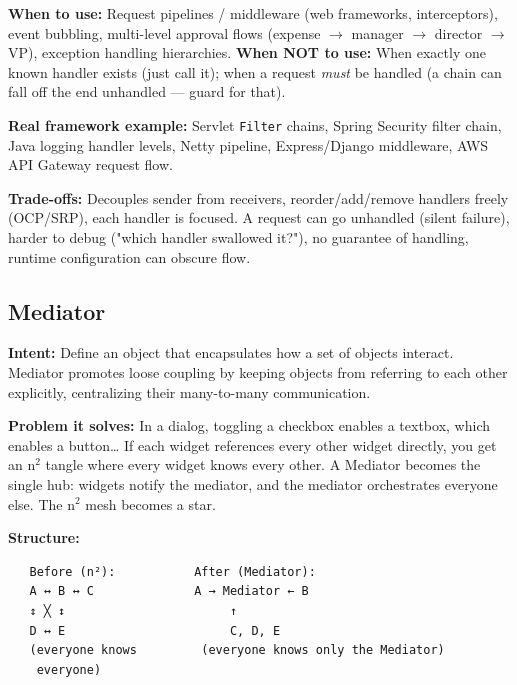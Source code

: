 \documentclass[11pt]{article}
\begin{document}
\textbf{When to use:} Request pipelines / middleware (web frameworks, interceptors), event bubbling, multi-level approval flows (expense \(\rightarrow\) manager \(\rightarrow\) director \(\rightarrow\) VP), exception handling hierarchies. \textbf{When NOT to use:} When exactly one known handler exists (just call it); when a request \emph{must} be handled (a chain can fall off the end unhandled --- guard for that).

\textbf{Real framework example:} Servlet \texttt{Filter} chains, Spring Security filter chain, Java logging handler levels, Netty pipeline, Express/Django middleware, AWS API Gateway request flow.

\textbf{Trade-offs:} Decouples sender from receivers, reorder/add/remove handlers freely (OCP/SRP), each handler is focused. A request can go unhandled (silent failure), harder to debug ("which handler swallowed it?"), no guarantee of handling, runtime configuration can obscure flow.

\subsection{Mediator}\label{mediator}

\textbf{Intent:} Define an object that encapsulates how a set of objects interact. Mediator promotes loose coupling by keeping objects from referring to each other explicitly, centralizing their many-to-many communication.

\textbf{Problem it solves:} In a dialog, toggling a checkbox enables a textbox, which enables a button\ldots{} If each widget references every other widget directly, you get an n\(^2\) tangle where every widget knows every other. A Mediator becomes the single hub: widgets notify the mediator, and the mediator orchestrates everyone else. The n\(^2\) mesh becomes a star.

\textbf{Structure:}

\setcodelang{}

\begin{verbatim}
   Before (n²):           After (Mediator):
   A ↔ B ↔ C              A → Mediator ← B
   ↕ ╳ ↕                       ↑
   D ↔ E                       C, D, E
   (everyone knows         (everyone knows only the Mediator)
    everyone)
\end{verbatim}

\end{document}
